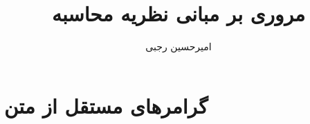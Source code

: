 \documentclass{article}
\title{مروری بر مبانی نظریه محاسبه}
\author{
	امیرحسین رجبی
}
\date{}
\begin{document}
	\maketitle
	
	\doublespacing
	
	\section{
	گرامرهای مستقل از متن
	}
	
	
	
 
\end{document}
